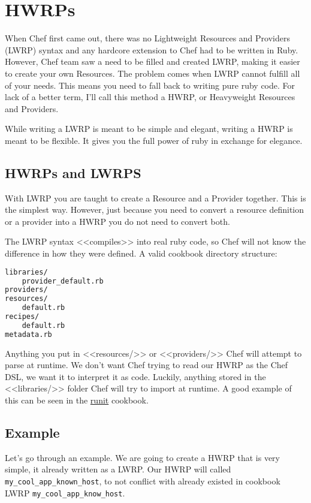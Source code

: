 \section{HWRPs}
\label{sec:cookbook-hwrp}

When Chef first came out, there was no Lightweight Resources and Providers (LWRP) syntax and any hardcore extension to Chef had to be written in Ruby. However, Chef team saw a need to be filled and created LWRP, making it easier to create your own Resources. The problem comes when LWRP cannot fulfill all of your needs. This means you need to fall back to writing pure ruby code. For lack of a better term, I'll call this method a HWRP, or Heavyweight Resources and Providers.

While writing a LWRP is meant to be simple and elegant, writing a HWRP is meant to be flexible. It gives you the full power of ruby in exchange for elegance.

\subsection{HWRPs and LWRPS}

With LWRP you are taught to create a Resource and a Provider together. This is the simplest way. However, just because you need to convert a resource definition or a provider into a HWRP you do not need to convert both.

The LWRP syntax <<compiles>> into real ruby code, so Chef will not know the difference in how they were defined. A valid cookbook directory structure:

\begin{lstlisting}[language=Bash,label=lst:cookbook-hwrp1]
libraries/
    provider_default.rb
providers/
resources/
    default.rb
recipes/
    default.rb
metadata.rb
\end{lstlisting}

Anything you put in <<resources/>> or <<providers/>> Chef will attempt to parse at runtime. We don't want Chef trying to read our HWRP as the Chef DSL, we want it to interpret it as code. Luckily, anything stored in the <<libraries/>> folder Chef will try to import at runtime. A good example of this can be seen in the \href{https://github.com/hw-cookbooks/runit}{runit} cookbook.

\subsection{Example}

Let's go through an example. We are going to create a HWRP that is very simple, it already written as a LWRP. Our HWRP will called \lstinline!my_cool_app_known_host!, to not conflict with already existed in cookbook LWRP \lstinline!my_cool_app_know_host!.

